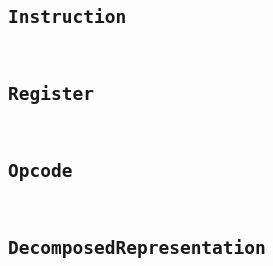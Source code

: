 \documentclass[a4paper]{article}
\begin{document}
\begin{appendix}
\begin{landscape}
    \section{\texttt{Instruction}}\label{code:Instruction}
    \begin{multicols}{2} %
    \inputminted[mathescape,
        linenos,
        numbersep=5pt,
        frame=none,
        framesep=2mm,
        fontsize=\footnotesize]{java}{../src/main/java/se/filipallberg/dark/mips32decompiler/instruction/Instruction.java}
    \end{multicols}
    \end{landscape}
    


    \begin{landscape}
    \section{\texttt{Register}}\label{code:Register}
    \begin{multicols}{2} %
    \inputminted[mathescape,
        linenos,
        numbersep=5pt,
        frame=none,
        framesep=2mm,
        fontsize=\footnotesize]{java}{../src/main/java/se/filipallberg/dark/mips32decompiler/instruction/util/Register.java}
    \end{multicols}
    \end{landscape}
    


    \begin{landscape}
    \section{\texttt{Opcode}}\label{code:Opcode}
    \begin{multicols}{2} %
    \inputminted[mathescape,
        linenos,
        numbersep=5pt,
        frame=none,
        framesep=2mm,
        fontsize=\footnotesize]{java}{../src/main/java/se/filipallberg/dark/mips32decompiler/instruction/util/Opcode.java}
    \end{multicols}
    \end{landscape}
    


    \begin{landscape}
    \section{\texttt{DecomposedRepresentation}}\label{code:DecomposedRepresentation}
    \begin{multicols}{2} %
    \inputminted[mathescape,
        linenos,
        numbersep=5pt,
        frame=none,
        framesep=2mm,
        fontsize=\footnotesize]{java}{../src/main/java/se/filipallberg/dark/mips32decompiler/instruction/util/DecomposedRepresentation.java}
    \end{multicols}
    \end{landscape}
    



\end{appendix}
\end{document}

